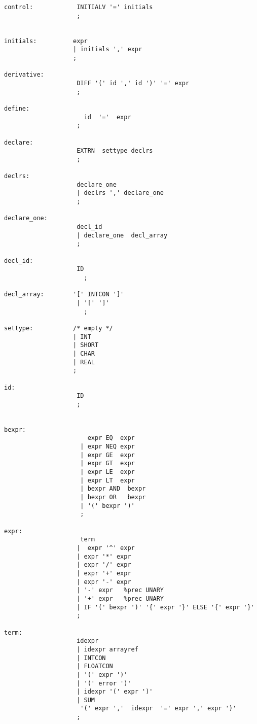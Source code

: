\documentclass{article}
\begin{document}
{{\begin{verbatim}
control:            INITIALV '=' initials
                    ;


initials:          expr
                   | initials ',' expr
                   ;

derivative:
                    DIFF '(' id ',' id ')' '=' expr
                    ;

define:             
                      id  '='  expr 
                    ;

declare:          
                    EXTRN  settype declrs
                    ;

declrs:
                    declare_one
                    | declrs ',' declare_one
                    ;

declare_one:
                    decl_id
                    | declare_one  decl_array 
                    ;

decl_id:
                    ID
                      ;

decl_array:        '[' INTCON ']'
                    | '[' ']'
                      ;

settype:           /* empty */ 
                   | INT
                   | SHORT
                   | CHAR
                   | REAL
                   ;
		    
id:
                    ID
                    ;


bexpr:
                       expr EQ  expr
                     | expr NEQ expr
                     | expr GE  expr
                     | expr GT  expr
                     | expr LE  expr
                     | expr LT  expr
                     | bexpr AND  bexpr
                     | bexpr OR   bexpr
                     | '(' bexpr ')'
                     ;

expr:
                     term
                    |  expr '^' expr
                    | expr '*' expr
                    | expr '/' expr
                    | expr '+' expr
                    | expr '-' expr
                    | '-' expr   %prec UNARY
                    | '+' expr   %prec UNARY
                    | IF '(' bexpr ')' '{' expr '}' ELSE '{' expr '}'
                    ;

term:
                    idexpr
                    | idexpr arrayref
                    | INTCON
                    | FLOATCON
                    | '(' expr ')'
                    | '(' error ')'
                    | idexpr '(' expr ')'
                    | SUM 
                     '(' expr ','  idexpr  '=' expr ',' expr ')'
                    ;


\end{verbatim}}}
\end{document}
